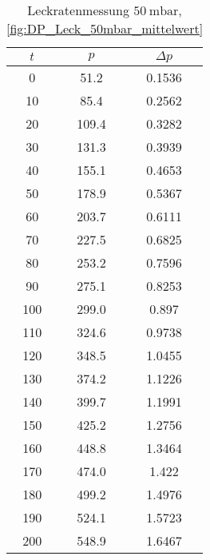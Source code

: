 \begin{table}[H]
    \centering
    \caption{Leckratenmessung $\SI{50}{\milli\bar}$, \ref{fig:DP_Leck_50mbar_mittelwert}}
    \label{tab:}
    \begin{tabular}{c c c}
        \toprule
        {$t$} & {$p$} & {$\Delta p$} \\
        \midrule
        0 & 51.2 & 0.1536  \\
        10 & 85.4 & 0.2562 \\
        20 & 109.4 & 0.3282\\
        30 & 131.3 & 0.3939\\
        40 & 155.1 & 0.4653\\
        50 & 178.9 & 0.5367\\
        60 & 203.7 & 0.6111\\
        70 & 227.5 & 0.6825\\
        80 & 253.2 & 0.7596\\
        90 & 275.1 & 0.8253\\
        100 & 299.0 & 0.897\\
        110 & 324.6 & 0.9738\\
        120 & 348.5 & 1.0455\\
        130 & 374.2 & 1.1226\\
        140 & 399.7 & 1.1991\\
        150 & 425.2 & 1.2756\\
        160 & 448.8 & 1.3464\\
        170 & 474.0 & 1.422\\
        180 & 499.2 & 1.4976\\
        190 & 524.1 & 1.5723\\
        200 & 548.9 & 1.6467\\
        \bottomrule
    \end{tabular}
\end{table}

